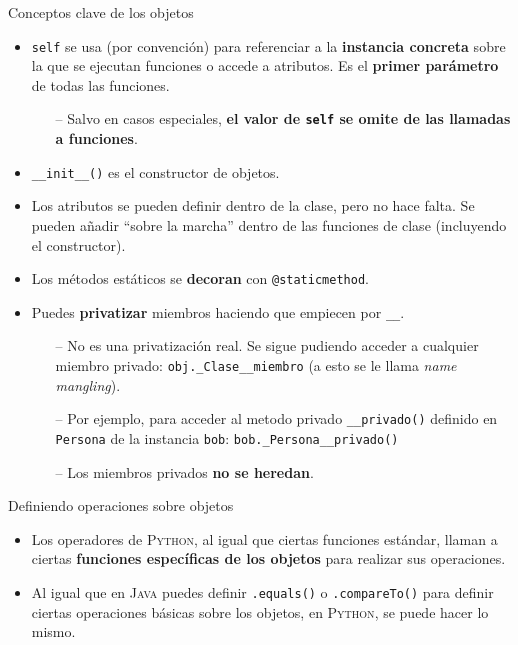\documentclass[10pt]{beamer} %
\newcommand{\py}{\textsc{Python}}
\begin{document}
\begin{frame}[fragile]{Conceptos clave de los objetos}
    \begin{itemize}
        \item \texttt{self} se usa (por convención) para referenciar a la \textbf{instancia concreta} sobre la que se ejecutan funciones o accede a atributos. Es el \textbf{primer parámetro} de todas las funciones.
        \begin{itemize}
            \item[--] Salvo en casos especiales, \textbf{el valor de \texttt{self} se omite de las llamadas a funciones}.
        \end{itemize}
        \item \texttt{\_\_init\_\_()} es el constructor de objetos.
        \item Los atributos se pueden definir dentro de la clase, pero no hace falta. Se pueden añadir ``sobre la marcha'' dentro de las funciones de clase (incluyendo el constructor).
        \item Los métodos estáticos se \textbf{decoran} con \texttt{@staticmethod}.
        \item Puedes \textbf{privatizar} miembros haciendo que empiecen por \texttt{\_\_}.
        \begin{itemize}
            \item[--] No es una privatización real. Se sigue pudiendo acceder a cualquier miembro privado: \texttt{obj.\_Clase\_\_miembro} (a esto se le llama \textit{name mangling}).
            \item[--] Por ejemplo, para acceder al metodo privado \texttt{\_\_privado()} definido en \texttt{Persona} de la instancia \texttt{bob}: \texttt{bob.\_Persona\_\_privado()}
            \item[--] Los miembros privados \textbf{no se heredan}.
        \end{itemize}
    \end{itemize}
\end{frame}

\begin{frame}[fragile]{Definiendo operaciones sobre objetos}
    \begin{itemize}
        \item Los operadores de \py, al igual que ciertas funciones estándar, llaman a ciertas \textbf{funciones específicas de los objetos} para realizar sus operaciones.\par
        \item Al igual que en \textsc{Java} puedes definir \texttt{.equals()} o \texttt{.compareTo()} para definir ciertas operaciones básicas sobre los objetos, en \py, se puede hacer lo mismo.
    \end{itemize}
\end{frame}
\end{document}
